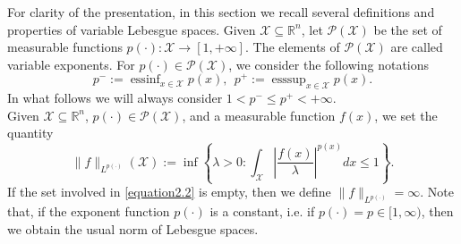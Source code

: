 \documentclass[a4paper,12pt]{amsart}
\theoremstyle{definition}
\theoremstyle{plain}
\begin{document}
For clarity of the presentation, in this section we recall 
several definitions and properties of variable Lebesgue spaces. Given $\mathcal{X}\subseteq \mathbb{R}^{n}$, let $\mathcal{P}(\mathcal{X})$ be the set of measurable functions $p(\cdot):\mathcal{X}\rightarrow[1,+\infty]$.  The elements of $\mathcal{P}(\mathcal{X})$ are called variable exponents. For $p(\cdot)\in \mathcal{P}(\mathcal{X})$, we consider the following notations
$$
 p^{-}:=\operatorname{essinf}_{x\in\mathcal{X}}p(x), \ \  p^{+}:=\operatorname{esssup}_{x\in\mathcal{X}}p(x).
$$
In what follows we will always  consider  $1<p^-\leq p^+<+\infty$.\\

Given  $\mathcal{X}\subseteq\mathbb{R}^{n}$,  $p(\cdot)\in \mathcal{P}(\mathcal{X})$,  and a measurable function $f(x)$,  we set the quantity
\begin{equation}\label{equation2.2}
   \|f\|_{L^{p(\cdot)}}(\mathcal{X}):=\inf\left\{\lambda>0: 
   \int_\mathcal{X} \left|\frac{f(x)}{\lambda}\right|^{p(x)}dx
\leq 1\right\}.
\end{equation}
If the set involved in  \eqref{equation2.2} is empty,  then we define $\|f\|_{L^{p(\cdot)}} = \infty$.
Note that,  if the exponent function $p(\cdot)$ is a constant, i.e. if $p(\cdot)=p\in [1,\infty)$, then we obtain the usual norm of Lebesgue spaces.
\smallbreak
\end{document}
